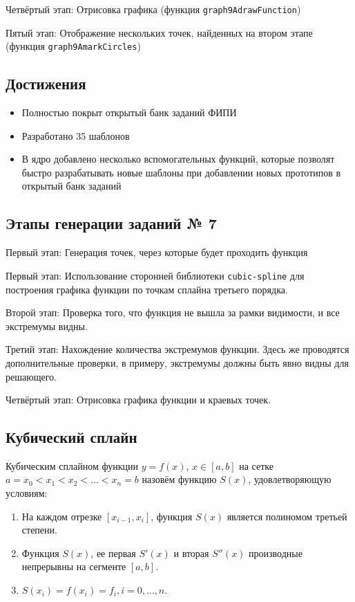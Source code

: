 \documentclass[a4paper, 12pt]{extarticle}
\begin{document}
Четвёртый этап: Отрисовка графика (функция \texttt{graph9AdrawFunction})

Пятый этап: Отображение нескольких точек, найденных на втором этапе (функция \texttt{graph9AmarkCircles})
\newpage
\subsection*{Достижения}
\begin{itemize}
    \item Полностью покрыт открытый банк заданий ФИПИ
    \item Разработано 35 шаблонов
    \item В ядро добавлено несколько вспомогательных функций, которые позволят быстро разрабатывать новые шаблоны при добавлении новых прототипов в открытый банк заданий
\end{itemize}

\subsection*{Этапы генерации заданий № 7}
    Первый этап: Генерация точек, через которые будет проходить функция
        
    Первый этап: Использование сторонней библиотеки \texttt{cubic-spline} для построения графика функции по точкам сплайна третьего порядка.
        
    Второй этап: Проверка того, что функция не вышла за рамки видимости, и все экстремумы видны. %
    
    Третий этап: Нахождение количества экстремумов функции.
    Здесь же проводятся дополнительные проверки, в примеру, экстремумы должны быть явно видны для решающего. 
        
    Четвёртый этап: Отрисовка графика функции и краевых точек.
    
\subsection*{Кубический сплайн}

Кубическим сплайном функции $y = f(x)$, $x\in[a, b]$ на сетке $a=x_0<x_1<x_2< \dots <x_n=b$ назовём функцию $S(x)$, удовлетворяющую условиям:
    \begin{enumerate}
        \item На каждом отрезке $[x_{i-1},x_i]$, функция $S(x)$ является полиномом третьей степени.
        \item Функция $S(x)$, ее первая $S'(x)$ и вторая $S''(x)$ производные непрерывны на сегменте $[a, b]$.
        \item $S(x_i)=f(x_i)=f_i, i=0,\dots,n$.
\end{enumerate}
\end{document}
